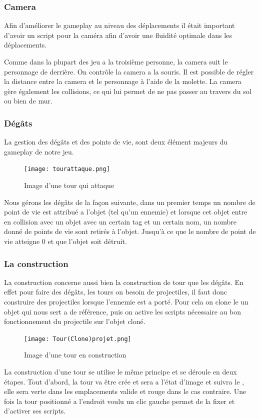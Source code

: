 \documentclass[a4paper, 12pt]{article}
\begin{document}
		\subsubsection{Camera}
		Afin d'améliorer le gameplay au niveau des déplacements il était important d'avoir un script pour la caméra afin d'avoir une fluidité optimale dans les déplacements.
		\par Comme dans la plupart des jeu a la troisième personne, la camera suit le personnage de derrière. On contrôle la camera a la souris. Il est possible de régler la distance entre la camera et le personnage à l'aide de la molette. La camera gère également les collisions, ce qui lui permet de ne pas passer au travers du sol ou bien de mur.
		\subsubsection{Dégâts}
		La gestion des dégâts et des points de vie, sont deux élément majeurs du gameplay de notre jeu.
	\begin{figure}[!ht]
		\centerline{\texttt{[image: tourattaque.png]}}
		\caption*{Image d'une tour qui attaque}
	\end{figure}		

		\par Nous gérons les dégâts de la façon suivante, dans un premier temps un nombre de point de vie est attribué a l'objet (tel qu'un ennemie) et lorsque cet objet entre en collision avec un objet avec un certain tag et un certain nom, un nombre donné de points de vie sont retirés à l'objet. Jusqu'à ce que le nombre de point de vie atteigne 0 et que l'objet soit détruit.
		\subsubsection{La construction}
		La construction concerne aussi bien la construction de tour que les dégâts. En effet pour faire des dégâts, les tours on besoin de projectiles, il faut donc construire des projectiles lorsque l'ennemie est a porté. Pour cela on clone le un objet qui nous sert a de référence, puis on active les scripts nécessaire au bon fonctionnement du projectile sur l'objet cloné.
	\begin{figure}[!ht]	
		\centerline{\texttt{[image: Tour(Clone)projet.png]}}	
		\caption*{Image d'une tour en construction}	
	\end{figure}
		
		\par La construction d'une tour se utilise le même principe et se déroule en deux étapes. Tout d'abord, la tour va être crée et sera a l'état d'image et suivra le , elle sera verte dans les emplacements valide et rouge dans le cas contraire. Une fois la tour positionné a l'endroit voulu un clic gauche permet de la fixer et d'activer ses scripts.
\end{document}
